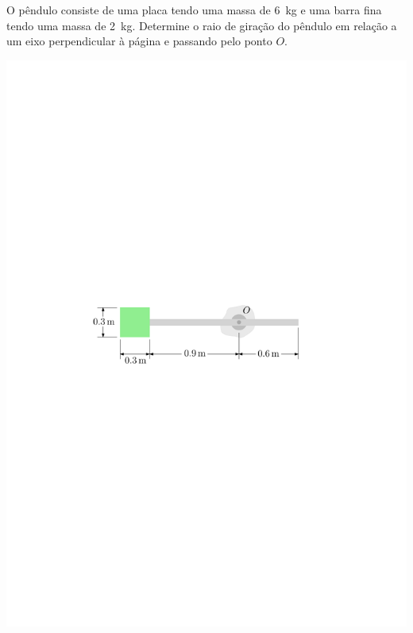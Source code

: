 \item O pêndulo consiste de uma placa tendo uma massa de \SI{6}{\kilogram} e uma barra fina tendo uma massa de \SI{2}{\kilogram}. Determine o raio de giração do pêndulo em relação a um eixo perpendicular à página e passando pelo ponto $O$.

\begin{flushright}
	\includegraphics[scale=.95]{../../images/draw_3}
\end{flushright}